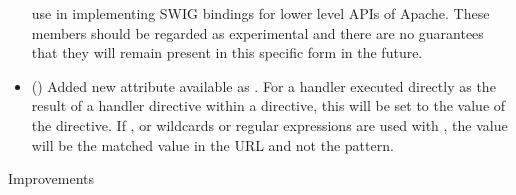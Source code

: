 \begin{itemize}
      use in implementing SWIG bindings for lower level APIs of Apache.
      These members should be regarded as experimental and there are no
      guarantees that they will remain present in this specific form in the
      future.
    \item
      ()
      Added new attribute available as . For a
      handler executed directly as the result of a handler directive
      within a  directive, this will be set to the value
      of the  directive. If , or
      wildcards or regular expressions are used with ,
      the value will be the matched value in the URL and not the pattern.
  \end{itemize}

  Improvements
  
